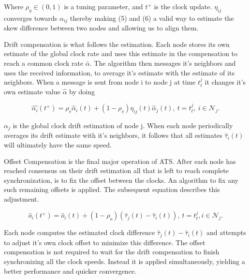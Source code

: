 \documentclass[a4paper,12pt]{article}
\begin{document}
    Where $\rho_\eta \in (0, 1)$ is a tuning parameter, and $t^+$ is the clock update. $\eta_{ij}$ converges towards $\alpha_{ij}$ thereby making (5) and (6) a valid way to estimate the skew difference between two nodes and allowing us to align them.
    
    Drift compensation is what follows the estimation. Each node stores its own estimate of the global clock rate and uses this estimate in the compensation to reach a common clock rate $\bar{\alpha}$. The algorithm then messages it's neighbors and uses the received information, to average it's estimate with the estimate of its neighbors. When a message is sent from node i to node j at time $t^j_\ell$ it changes it's own estimate value $\hat{\alpha}$ by doing
    
    \begin{equation}
        \hat{\alpha_i}(t^+) = \rho_v\hat\alpha_i(t) + (1 - \rho_v)\eta_{ij}(t)\hat\alpha_j(t), \ t = t^j_\ell, \ i \in \mathcal{N}_j.
    \end{equation}
    
    $\alpha_j$ is the global clock drift estimation of node j. When each node periodically averages its drift estimate with it's neighbors, it follows that all estimates $\hat\tau_i(t)$ will ultimately have the same speed.
    
    
    Offset Compensation is the final major operation of ATS. After each node has reached consensus on their drift estimation all that is left to reach complete synchronization, is to fix the offset between the clocks. An algorithm to fix any such remaining offsets is applied. The subsequent equation describes this adjustment.
    
    \begin{equation}
        \hat{o}_i(t^+) = \hat{o}_i(t) + (1 - \rho_o)(\hat{\tau}_j(t) - \hat{\tau}_i(t)), \ t=t^j_\ell,i \in \mathcal{N}_j.
    \end{equation}
    
    Each node computes the estimated clock difference $\hat\tau_j(t) - \hat\tau_i(t)$ and attempts to adjust it's own clock offset to minimize this difference. The offset compensation is not required to wait for the drift compensation to finish synchronizing all the clock speeds. Instead it is applied simultaneously, yielding a better performance and quicker convergence.  
    
\end{document}
